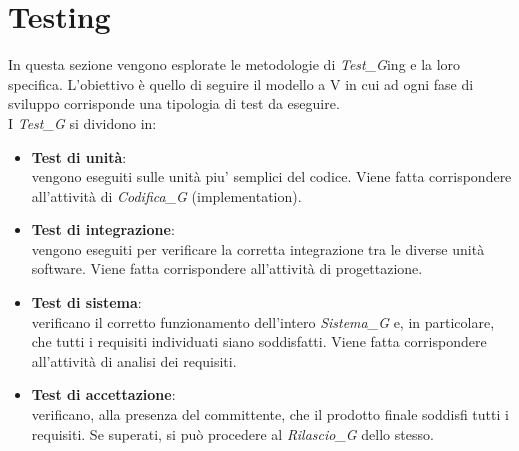 \section{Testing}
In questa sezione vengono esplorate le metodologie di \textit{Test_G}ing e la loro specifica. L'obiettivo è quello di seguire il modello a V in cui ad ogni fase di sviluppo corrisponde una tipologia di test da eseguire.\\
I \textit{Test_G} si dividono in:
\begin{itemize}
    \item \textbf{Test di unità}:\\
    vengono eseguiti sulle unità piu' semplici del codice. Viene fatta corrispondere all'attività di \textit{Codifica_G} (implementation).
    \item \textbf{Test di integrazione}:\\
    vengono eseguiti per verificare la corretta integrazione tra le diverse unità software. Viene fatta corrispondere all'attività di progettazione.
    \item \textbf{Test di sistema}:\\
    verificano il corretto funzionamento dell'intero \textit{Sistema_G} e, in particolare, che tutti i requisiti individuati siano soddisfatti. Viene fatta corrispondere all'attività di analisi dei requisiti. 
    \item \textbf{Test di accettazione}:\\
    verificano, alla presenza del committente, che il prodotto finale soddisfi tutti i requisiti. Se superati, si può procedere al \textit{Rilascio_G} dello stesso.
\end{itemize}